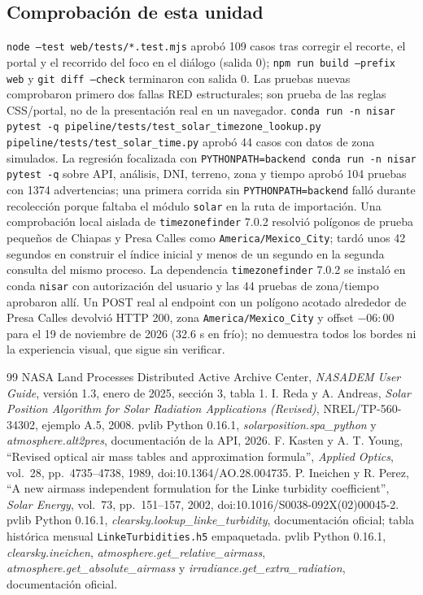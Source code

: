 \documentclass[11pt,a4paper]{article}
\begin{document}
\subsection{Comprobación de esta unidad}
\texttt{node --test web/tests/*.test.mjs} aprobó 109 casos tras corregir el recorte, el portal y el recorrido del foco en el diálogo (salida 0); \texttt{npm run build --prefix web} y \texttt{git diff --check} terminaron con salida 0. Las pruebas nuevas comprobaron primero dos fallas RED estructurales; son prueba de las reglas CSS/portal, no de la presentación real en un navegador. \texttt{conda run -n nisar pytest -q pipeline/tests/test\_solar\_timezone\_lookup.py pipeline/tests/test\_solar\_time.py} aprobó 44 casos con datos de zona simulados. La regresión focalizada con \texttt{PYTHONPATH=backend conda run -n nisar pytest -q} sobre API, análisis, DNI, terreno, zona y tiempo aprobó 104 pruebas con 1374 advertencias; una primera corrida sin \texttt{PYTHONPATH=backend} falló durante recolección porque faltaba el módulo \texttt{solar} en la ruta de importación. Una comprobación local aislada de \texttt{timezonefinder} 7.0.2 resolvió polígonos de prueba pequeños de Chiapas y Presa Calles como \texttt{America/Mexico\_City}; tardó unos 42 segundos en construir el índice inicial y menos de un segundo en la segunda consulta del mismo proceso. La dependencia \texttt{timezonefinder} 7.0.2 se instaló en conda \texttt{nisar} con autorización del usuario y las 44 pruebas de zona/tiempo aprobaron allí. Un POST real al endpoint con un polígono acotado alrededor de Presa Calles devolvió HTTP 200, zona \texttt{America/Mexico\_City} y offset $-06{:}00$ para el 19 de noviembre de 2026 (32.6 s en frío); no demuestra todos los bordes ni la experiencia visual, que sigue sin verificar.

\begin{thebibliography}{99}
 NASA Land Processes Distributed Active Archive Center, \emph{NASADEM User Guide}, versión 1.3, enero de 2025, sección 3, tabla 1.
 I. Reda y A. Andreas, \emph{Solar Position Algorithm for Solar Radiation Applications (Revised)}, NREL/TP-560-34302, ejemplo A.5, 2008.
 pvlib Python 0.16.1, \emph{solarposition.spa\_python} y \emph{atmosphere.alt2pres}, documentación de la API, 2026.
 F. Kasten y A. T. Young, ``Revised optical air mass tables and approximation formula'', \emph{Applied Optics}, vol.~28, pp.~4735--4738, 1989, doi:10.1364/AO.28.004735.
 P. Ineichen y R. Perez, ``A new airmass independent formulation for the Linke turbidity coefficient'', \emph{Solar Energy}, vol.~73, pp.~151--157, 2002, doi:10.1016/S0038-092X(02)00045-2.
 pvlib Python 0.16.1, \emph{clearsky.lookup\_linke\_turbidity}, documentación oficial; tabla histórica mensual \texttt{LinkeTurbidities.h5} empaquetada.
 pvlib Python 0.16.1, \emph{clearsky.ineichen}, \emph{atmosphere.get\_relative\_airmass}, \emph{atmosphere.get\_absolute\_airmass} y \emph{irradiance.get\_extra\_radiation}, documentación oficial.
\end{thebibliography}
\end{document}
